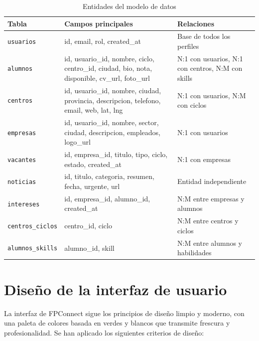 \documentclass[12pt, a4paper]{report}
\begin{document}
\vspace{0.5em}
\begin{table}[H]
  \centering
  \caption{Entidades del modelo de datos}
  \begin{tabularx}{\textwidth}{lXX}
    \toprule
    \textbf{Tabla} & \textbf{Campos principales} & \textbf{Relaciones} \\
    \midrule
    \texttt{usuarios}
      & id, email, rol, created\_at
      & Base de todos los perfiles \\
    \addlinespace
    \texttt{alumnos}
      & id, usuario\_id, nombre, ciclo, centro\_id, ciudad, bio, nota, disponible, cv\_url, foto\_url
      & N:1 con usuarios, N:1 con centros, N:M con skills \\
    \addlinespace
    \texttt{centros}
      & id, usuario\_id, nombre, ciudad, provincia, descripcion, telefono, email, web, lat, lng
      & N:1 con usuarios, N:M con ciclos \\
    \addlinespace
    \texttt{empresas}
      & id, usuario\_id, nombre, sector, ciudad, descripcion, empleados, logo\_url
      & N:1 con usuarios \\
    \addlinespace
    \texttt{vacantes}
      & id, empresa\_id, titulo, tipo, ciclo, estado, created\_at
      & N:1 con empresas \\
    \addlinespace
    \texttt{noticias}
      & id, titulo, categoria, resumen, fecha, urgente, url
      & Entidad independiente \\
    \addlinespace
    \texttt{intereses}
      & id, empresa\_id, alumno\_id, created\_at
      & N:M entre empresas y alumnos \\
    \addlinespace
    \texttt{centros\_ciclos}
      & centro\_id, ciclo
      & N:M entre centros y ciclos \\
    \addlinespace
    \texttt{alumnos\_skills}
      & alumno\_id, skill
      & N:M entre alumnos y habilidades \\
    \bottomrule
  \end{tabularx}
\end{table}

\section{Diseño de la interfaz de usuario}

La interfaz de FPConnect sigue los principios de diseño limpio y moderno, con una paleta de colores
basada en verdes y blancos que transmite frescura y profesionalidad. Se han aplicado los siguientes
criterios de diseño:
\end{document}
